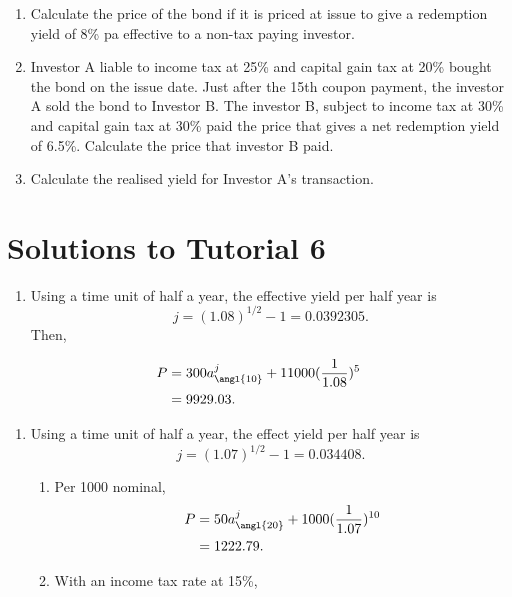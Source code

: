 \documentclass[
]{article}
\providecommand{\tightlist}{%
  \setlength{\itemsep}{0pt}\setlength{\parskip}{0pt}}
\theoremstyle{definition}
\theoremstyle{definition}
\theoremstyle{definition}
\theoremstyle{definition}
\theoremstyle{remark}
\begin{document}
\begin{enumerate}
  \begin{enumerate}
  \def\labelenumii{\arabic{enumii}.}
  \item
    Calculate the price of the bond if it is priced at issue to give
    a redemption yield of 8\% pa effective to a non-tax paying
    investor.
  \item
    Investor A liable to income tax at 25\% and capital gain tax at
    20\% bought the bond on the issue date. Just after the 15th
    coupon payment, the investor A sold the bond to Investor B. The
    investor B, subject to income tax at 30\% and capital gain tax at
    30\% paid the price that gives a net redemption yield of 6.5\%.
    Calculate the price that investor B paid.
  \item
    Calculate the realised yield for Investor A's transaction.
  \end{enumerate}
\end{enumerate}

\hypertarget{solutions-to-tutorial-6}{%
\section{Solutions to Tutorial 6}\label{solutions-to-tutorial-6}}

\begin{enumerate}
\def\labelenumi{\arabic{enumi}.}
\tightlist
\item
  Using a time unit of half a year, the effective yield per half year is
  \[j = (1.08)^{1/2} - 1 = 0.0392305.\]
  Then,
\end{enumerate}

\[
\begin{aligned}
P &= 300 a^j_{\angl{10}} + 11000 (\frac{1}{1.08})^{5} \\
&= 9929.03.
\end{aligned}
\]

\begin{enumerate}
\def\labelenumi{\arabic{enumi}.}
\setcounter{enumi}{1}
\item
  Using a time unit of half a year, the effect yield per half year is
  \[j = (1.07)^{1/2} - 1 = 0.034408.\]

  \begin{enumerate}
  \def\labelenumii{\arabic{enumii}.}
  \tightlist
  \item
    Per 1000 nominal,
    \[
    \begin{aligned}
    P &= 50 a^j_{\angl{20}} + 1000 (\frac{1}{1.07})^{10} \\
    &= 1222.79.
    \end{aligned}
    \]
  \item
    With an income tax rate at 15\%,
  \end{enumerate}
\end{enumerate}
\end{document}
